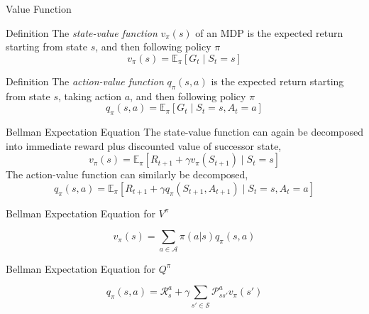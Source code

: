 \begin{frame}{Value Function}
\begin{block}{Definition}
The \emph{state-value function} $v_\pi(s)$ of an MDP is the expected return starting from state $s$, and then following policy $\pi$
\[ v_\pi(s) = \mathbb{E}_\pi[G_t \mid S_t = s] \]
\end{block}
\begin{block}{Definition}
The \emph{action-value function} $q_\pi(s, a)$ is the expected return starting from state $s$, taking action $a$, and then following policy $\pi$
\[ q_\pi(s, a) = \mathbb{E}_\pi[G_t \mid S_t = s, A_t = a] \]
\end{block}
\end{frame}

\begin{frame}{Bellman Expectation Equation}
The state-value function can again be decomposed into immediate reward plus discounted value of successor state,
\[ v_\pi(s) = \mathbb{E}_\pi[R_{t+1} + \gamma v_\pi(S_{t+1}) \mid S_t = s] \]
\vspace{1em}
The action-value function can similarly be decomposed,
\[ q_\pi(s, a) = \mathbb{E}_\pi[R_{t+1} + \gamma q_\pi(S_{t+1}, A_{t+1}) \mid S_t = s, A_t = a] \]
\end{frame}

\begin{frame}{Bellman Expectation Equation for $V^\pi$}
\begin{center}
\end{center}
\[ v_\pi(s) = \sum_{a \in \mathcal{A}} \pi(a|s) q_\pi(s, a) \]
\end{frame}

\begin{frame}{Bellman Expectation Equation for $Q^\pi$}
\begin{center}
\end{center}
\[ q_\pi(s, a) = \mathcal{R}^a_s + \gamma \sum_{s' \in \mathcal{S}} \mathcal{P}^a_{ss'} v_\pi(s') \]
\end{frame}

